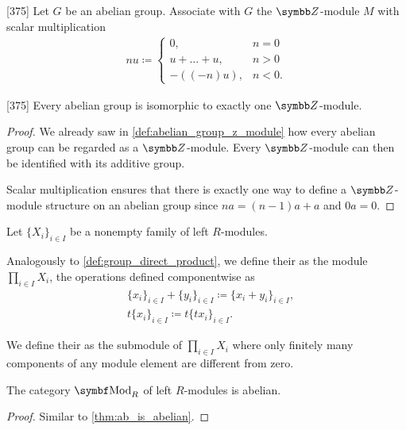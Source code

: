 \begin{definition}\label{def:abelian_group_z_module}\cite{Knapp2016BAlg}[375]
  Let \( G \) be an abelian group. Associate with \( G \) the \( \BZ \)-module \( M \) with scalar multiplication
  \begin{align*}
    nu \coloneqq \begin{cases}
      0, &n = 0 \\
      u + \ldots + u, &n > 0 \\
      -((-n)u), &n < 0.
    \end{cases}
  \end{align*}
\end{definition}

\begin{proposition}\label{thm:abelian_group_iff_z_module}\cite{Knapp2016BAlg}[375]
  Every abelian group is isomorphic to exactly one \( \BZ \)-module.
\end{proposition}
\begin{proof}
  We already saw in \cref{def:abelian_group_z_module} how every abelian group can be regarded as a \( \BZ \)-module. Every \( \BZ \)-module can then be identified with its additive group.

  Scalar multiplication ensures that there is exactly one way to define a \( \BZ \)-module structure on an abelian group since \( na = (n-1)a + a \) and \( 0a = 0 \).
\end{proof}

\begin{definition}\label{def:left_module_direct_product}
  Let \( \{ X_i \}_{i \in I} \) be a nonempty family of left \( R \)-modules.

  Analogously to \cref{def:group_direct_product}, we define their  as the module \( \prod_{i \in I} X_i \), the operations defined componentwise as
  \begin{align*}
    &\{ x_i \}_{i \in I} + \{ y_i \}_{i \in I}
    \coloneqq
    \{ x_i + y_i \}_{i \in I}, \\
    &t \{ x_i \}_{i \in I}
    \coloneqq
    t \{ t x_i \}_{i \in I}.
  \end{align*}

  We define their  as the submodule of \( \prod_{i \in I} X_i \) where only finitely many components of any module element are different from zero.
\end{definition}

\begin{proposition}\label{thm:mod_r_is_abelian}
  The category \( \Cat{Mod}_R \) of left \( R \)-modules is abelian.
\end{proposition}
\begin{proof}
  Similar to \cref{thm:ab_is_abelian}.
\end{proof}

